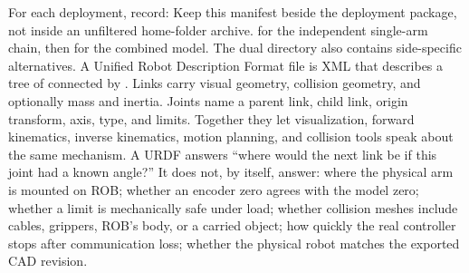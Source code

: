 {}\markdownRendererSectionBegin
{}\markdownRendererInterblockSeparator
{}For each deployment, record:\markdownRendererInterblockSeparator
{}\markdownRendererInterblockSeparator
{}Keep this manifest beside the deployment package, not inside an unfiltered home-folder archive.\markdownRendererInterblockSeparator
{}
\markdownRendererSectionEnd 
\markdownRendererSectionEnd \markdownRendererSectionBegin
{}\markdownRendererInterblockSeparator
{}\markdownRendererBlockQuoteBegin
{}  for the independent single-arm chain, then  for the combined model. The dual directory also contains side-specific alternatives.\markdownRendererBlockQuoteEnd \markdownRendererInterblockSeparator
{}A Unified Robot Description Format file is XML that describes a tree of  connected by . Links carry visual geometry, collision geometry, and optionally mass and inertia. Joints name a parent link, child link, origin transform, axis, type, and limits. Together they let visualization, forward kinematics, inverse kinematics, motion planning, and collision tools speak about the same mechanism.\markdownRendererParagraphSeparator
{}A URDF answers “where would the next link be if this joint had a known angle?” It does not, by itself, answer:\markdownRendererInterblockSeparator
{}\markdownRendererUlBegin
\markdownRendererUlItem where the physical arm is mounted on ROB;\markdownRendererUlItemEnd 
\markdownRendererUlItem whether an encoder zero agrees with the model zero;\markdownRendererUlItemEnd 
\markdownRendererUlItem whether a limit is mechanically safe under load;\markdownRendererUlItemEnd 
\markdownRendererUlItem whether collision meshes include cables, grippers, ROB's body, or a carried object;\markdownRendererUlItemEnd 
\markdownRendererUlItem how quickly the real controller stops after communication loss;\markdownRendererUlItemEnd 
\markdownRendererUlItem whether the physical robot matches the exported CAD revision.\markdownRendererUlItemEnd 
\markdownRendererUlEnd \markdownRendererInterblockSeparator

